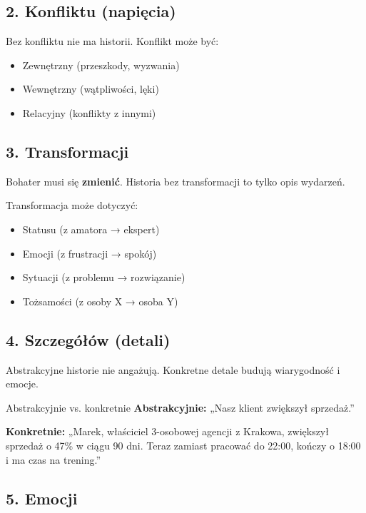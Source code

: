 \documentclass[
  12pt,
  a4paper,
  twoside,
  openright,
  12pt,
  DIV=12,
  BCOR=12mm]{scrbook}
\providecommand{\tightlist}{%
  \setlength{\itemsep}{0pt}\setlength{\parskip}{0pt}}\usepackage{longtable,booktabs,array}
\begin{document}
\subsection{2. Konfliktu (napięcia)}\label{konfliktu-napiux119cia}

Bez konfliktu nie ma historii. Konflikt może być:

\begin{itemize}
\tightlist
\item
  Zewnętrzny (przeszkody, wyzwania)
\item
  Wewnętrzny (wątpliwości, lęki)
\item
  Relacyjny (konflikty z innymi)
\end{itemize}

\subsection{3. Transformacji}\label{transformacji}

Bohater musi się \textbf{zmienić}. Historia bez transformacji to tylko
opis wydarzeń.

Transformacja może dotyczyć:

\begin{itemize}
\tightlist
\item
  Statusu (z amatora → ekspert)
\item
  Emocji (z frustracji → spokój)
\item
  Sytuacji (z problemu → rozwiązanie)
\item
  Tożsamości (z osoby X → osoba Y)
\end{itemize}

\subsection{4. Szczegółów (detali)}\label{szczeguxf3ux142uxf3w-detali}

Abstrakcyjne historie nie angażują. Konkretne detale budują wiarygodność
i emocje.

\begin{przyklad}{Abstrakcyjnie vs. konkretnie}
\textbf{Abstrakcyjnie:} „Nasz klient zwiększył sprzedaż.”

\textbf{Konkretnie:} „Marek, właściciel 3-osobowej agencji z Krakowa, zwiększył sprzedaż o 47\% w ciągu 90 dni. Teraz zamiast pracować do 22:00, kończy o 18:00 i ma czas na trening.”
\end{przyklad}

\subsection{5. Emocji}\label{emocji}
\end{document}
